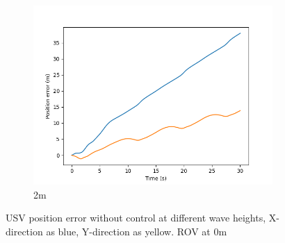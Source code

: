 \documentclass[class=article, crop=false]{standalone}
\begin{document}
\begin{figure}
\begin{subfigure}[b]{0.48\textwidth}
        \centering
        \includegraphics{scenario1/rov-0m/2.0m/usv_pos_error_uncontrolled}
        \caption{2m}
        \label{}
    \end{subfigure}
    \caption{USV position error without control at different wave heights, X-direction as blue, Y-direction as yellow. ROV at 0m}
    \label{}
\end{figure}
\end{document}
